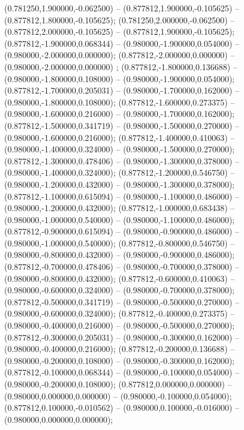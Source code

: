  (0.781250,1.900000,-0.062500) -- (0.877812,1.900000,-0.105625) -- (0.877812,1.800000,-0.105625);
 (0.781250,2.000000,-0.062500) -- (0.877812,2.000000,-0.105625) -- (0.877812,1.900000,-0.105625);
 (0.877812,-1.900000,0.068344) -- (0.980000,-1.900000,0.054000) -- (0.980000,-2.000000,0.000000);
 (0.877812,-2.000000,0.000000) -- (0.980000,-2.000000,0.000000) ;
 (0.877812,-1.800000,0.136688) -- (0.980000,-1.800000,0.108000) -- (0.980000,-1.900000,0.054000);
 (0.877812,-1.700000,0.205031) -- (0.980000,-1.700000,0.162000) -- (0.980000,-1.800000,0.108000);
 (0.877812,-1.600000,0.273375) -- (0.980000,-1.600000,0.216000) -- (0.980000,-1.700000,0.162000);
 (0.877812,-1.500000,0.341719) -- (0.980000,-1.500000,0.270000) -- (0.980000,-1.600000,0.216000);
 (0.877812,-1.400000,0.410063) -- (0.980000,-1.400000,0.324000) -- (0.980000,-1.500000,0.270000);
 (0.877812,-1.300000,0.478406) -- (0.980000,-1.300000,0.378000) -- (0.980000,-1.400000,0.324000);
 (0.877812,-1.200000,0.546750) -- (0.980000,-1.200000,0.432000) -- (0.980000,-1.300000,0.378000);
 (0.877812,-1.100000,0.615094) -- (0.980000,-1.100000,0.486000) -- (0.980000,-1.200000,0.432000);
 (0.877812,-1.000000,0.683438) -- (0.980000,-1.000000,0.540000) -- (0.980000,-1.100000,0.486000);
 (0.877812,-0.900000,0.615094) -- (0.980000,-0.900000,0.486000) -- (0.980000,-1.000000,0.540000);
 (0.877812,-0.800000,0.546750) -- (0.980000,-0.800000,0.432000) -- (0.980000,-0.900000,0.486000);
 (0.877812,-0.700000,0.478406) -- (0.980000,-0.700000,0.378000) -- (0.980000,-0.800000,0.432000);
 (0.877812,-0.600000,0.410063) -- (0.980000,-0.600000,0.324000) -- (0.980000,-0.700000,0.378000);
 (0.877812,-0.500000,0.341719) -- (0.980000,-0.500000,0.270000) -- (0.980000,-0.600000,0.324000);
 (0.877812,-0.400000,0.273375) -- (0.980000,-0.400000,0.216000) -- (0.980000,-0.500000,0.270000);
 (0.877812,-0.300000,0.205031) -- (0.980000,-0.300000,0.162000) -- (0.980000,-0.400000,0.216000);
 (0.877812,-0.200000,0.136688) -- (0.980000,-0.200000,0.108000) -- (0.980000,-0.300000,0.162000);
 (0.877812,-0.100000,0.068344) -- (0.980000,-0.100000,0.054000) -- (0.980000,-0.200000,0.108000);
 (0.877812,0.000000,0.000000) -- (0.980000,0.000000,0.000000) -- (0.980000,-0.100000,0.054000);
 (0.877812,0.100000,-0.010562) -- (0.980000,0.100000,-0.016000) -- (0.980000,0.000000,0.000000);
